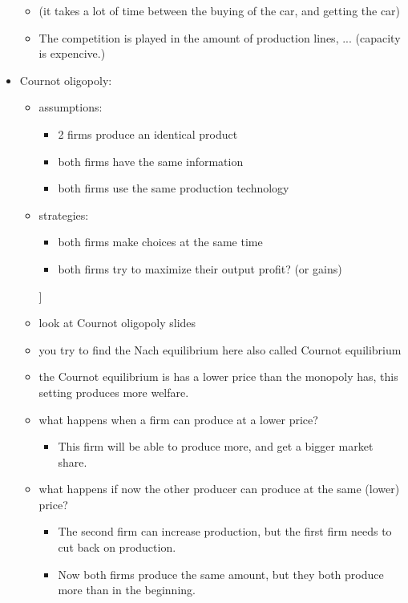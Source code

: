 \documentclass[12pt, a4paper, titlepage]{extarticle}
\begin{document}
\begin{itemize}
\begin{itemize}
            \item (it takes a lot of time between the buying of the car, and getting the car)
            \item The competition is played in the amount of production lines, ... (capacity is expencive.)
        \end{itemize}
        \item Cournot oligopoly:
        \begin{itemize}
            \item assumptions:
            \begin{itemize}
                \item 2 firms produce an identical product
                \item both firms have the same information
                \item both firms use the same production technology
            \end{itemize}
            \item strategies:
            \begin{itemize}
                \item both firms make choices at the same time
                \item both firms try to maximize their output profit? (or gains)
            \end{itemize}]
            \item look at Cournot oligopoly slides
            \item you try to find the Nach equilibrium here also called Cournot equilibrium
            \item the Cournot equilibrium is has a lower price than the monopoly has, this setting produces more welfare.
            \item what happens when a firm can produce at a lower price?
            \begin{itemize}
                \item This firm will be able to produce more, and get a bigger market share.
            \end{itemize}
            \item what happens if now the other producer can produce at the same (lower) price?
            \begin{itemize}
                \item The second firm can increase production, but the first firm needs to cut back on production.
                \item Now both firms produce the same amount, but they both produce more than in the beginning.
            \end{itemize}
        \end{itemize}
    \end{itemize}
\end{document}
